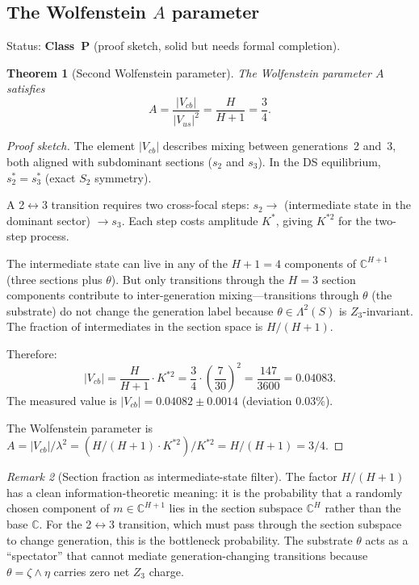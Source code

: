 \documentclass[11pt,a4paper]{article}
\newtheorem{theorem}{Theorem}[section]
\theoremstyle{definition}
\theoremstyle{remark}
\newtheorem{remark}[theorem]{Remark}
\newcommand{\C}{\mathbb{C}}
\begin{document}
\subsection{The Wolfenstein $A$ parameter}\label{sec:wolfenstein_A}

Status: \textbf{Class~P} (proof sketch, solid but needs formal completion).

\begin{theorem}[Second Wolfenstein parameter]\label{thm:wolfenstein_A}
The Wolfenstein parameter $A$ satisfies
\begin{equation}\label{eq:A_param}
A = \frac{|V_{cb}|}{|V_{us}|^2} = \frac{H}{H+1} = \frac{3}{4}.
\end{equation}
\end{theorem}

\begin{proof}[Proof sketch]
The element $|V_{cb}|$ describes mixing between generations~2 and~3, both aligned with subdominant sections ($s_2$ and $s_3$). In the DS equilibrium, $s_2^* = s_3^*$ (exact $S_2$ symmetry).

A 2$\leftrightarrow$3 transition requires two cross-focal steps: $s_2 \to$ (intermediate state in the dominant sector) $\to s_3$. Each step costs amplitude $K^*$, giving $K^{*2}$ for the two-step process.

The intermediate state can live in any of the $H+1 = 4$ components of $\C^{H+1}$ (three sections plus $\theta$). But only transitions through the $H = 3$ section components contribute to inter-generation mixing---transitions through $\theta$ (the substrate) do not change the generation label because $\theta \in \Lambda^2(S)$ is $Z_3$-invariant. The fraction of intermediates in the section space is $H/(H+1)$.

Therefore:
\[
|V_{cb}| = \frac{H}{H+1} \cdot K^{*2} = \frac{3}{4} \cdot \left(\frac{7}{30}\right)^2 = \frac{147}{3600} = 0.04083.
\]
The measured value is $|V_{cb}| = 0.04082 \pm 0.0014$ (deviation $0.03\%$).

The Wolfenstein parameter is $A = |V_{cb}|/\lambda^2 = (H/(H+1) \cdot K^{*2})/K^{*2} = H/(H+1) = 3/4$.
\end{proof}

\begin{remark}[Section fraction as intermediate-state filter]\label{rem:section_fraction}
The factor $H/(H+1)$ has a clean information-theoretic meaning: it is the probability that a randomly chosen component of $m \in \C^{H+1}$ lies in the section subspace $\C^H$ rather than the base $\C$. For the 2$\leftrightarrow$3 transition, which must pass through the section subspace to change generation, this is the bottleneck probability. The substrate $\theta$ acts as a ``spectator'' that cannot mediate generation-changing transitions because $\theta = \zeta \wedge \eta$ carries zero net $Z_3$ charge.
\end{remark}
\end{document}
